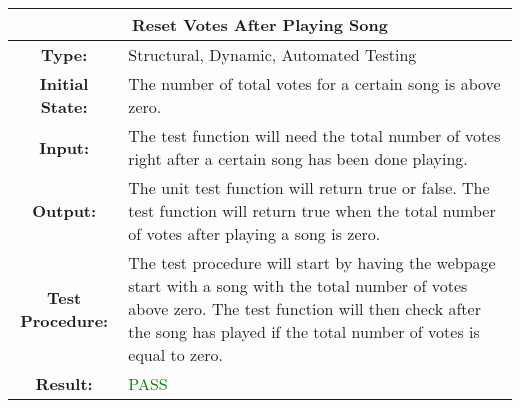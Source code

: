 \documentclass[12pt, titlepage]{article}
\begin{document}
\begin{center}
\begin{table}[H]
\begin{tabularx}{\textwidth}{| c X |}
\hline
\multicolumn{2}{|c|}{\textbf{Reset Votes After Playing Song}}\\
\hline
\textbf{Type: } & Structural, Dynamic, Automated Testing\\


\textbf{Initial State: } & The number of total votes for a certain song is above zero.\\


\textbf{Input: } & The test function will need the total number of votes right after a certain song has been done playing.\\


\textbf{Output: } & The unit test function will return true or false. The test function will return true when the total number of votes after playing a song is zero.\\


\textbf{Test Procedure: } & The test procedure will start by having the webpage start with a song with the total number of votes above zero. The test function will then check after the song has played if the total number of votes is equal to zero. \\


\textbf{Result: } & \textcolor{green}{PASS}\\
\hline
\end{tabularx}
\end{table}
\end{center}
\end{document}
